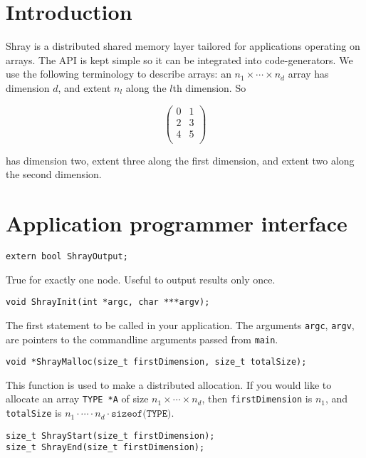 \documentclass{article}
\begin{document}
\section*{Introduction}

Shray is a distributed shared memory layer tailored for applications operating on arrays.
The API is kept simple so it can be integrated into code-generators. We use the following 
terminology to describe arrays: an $n_1 \times \cdots \times n_d$ array has dimension $d$,
and extent $n_l$ along the $l$th dimension. So 

\[
\begin{pmatrix}
    0 & 1 \\
    2 & 3 \\
    4 & 5 \\
\end{pmatrix}
\]

has dimension two, extent three along the first dimension, and extent two along the second 
dimension. 

\section{Application programmer interface}

\begin{lstlisting}
extern bool ShrayOutput;
\end{lstlisting}

True for exactly one node. Useful to output results only once. 

\begin{lstlisting}
void ShrayInit(int *argc, char ***argv);
\end{lstlisting}

The first statement to be called in your application. The arguments 
\texttt{argc}, \texttt{argv}, are pointers to the commandline arguments passed from 
\texttt{main}. 

\begin{lstlisting}
void *ShrayMalloc(size_t firstDimension, size_t totalSize);
\end{lstlisting}

This function is used to make a distributed allocation. If you would like to allocate an 
array \texttt{TYPE *A} of size $n_1 \times \cdots \times n_d$, then \texttt{firstDimension}
is $n_1$, and \texttt{totalSize} is $n_1 \cdot \cdots \cdot n_d \cdot \texttt{sizeof(TYPE)}$.

\begin{lstlisting}
size_t ShrayStart(size_t firstDimension);
size_t ShrayEnd(size_t firstDimension);
\end{lstlisting}
\end{document}
